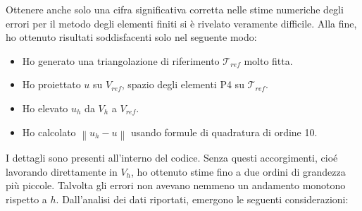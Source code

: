 \documentclass[a4paper]{article}
\newcommand{\norm}[1]{\left\lVert#1\right\rVert}
\begin{document}
Ottenere anche solo una cifra significativa corretta nelle stime numeriche
degli errori per il metodo degli elementi finiti si è rivelato veramente difficile.
Alla fine, ho ottenuto risultati soddisfacenti solo nel seguente modo:
\begin{itemize}
\item Ho generato una triangolazione di riferimento $\mathcal{T}_{ref}$ molto fitta.
\item Ho proiettato $u$ su $V_{ref}$, spazio degli elementi P4 su $\mathcal{T}_{ref}$.
\item Ho elevato $u_h$ da $V_h$ a $V_{ref}$.
\item Ho calcolato $\norm{u_h - u}$ usando formule di quadratura di ordine 10.
\end{itemize}
I dettagli sono presenti all'interno del codice. Senza questi accorgimenti,
cioé lavorando direttamente in $V_h$, ho ottenuto stime fino a due ordini
di grandezza più piccole. Talvolta gli errori non avevano nemmeno
un andamento monotono rispetto a $h$.
Dall'analisi dei dati riportati, emergono le seguenti considerazioni:
\end{document}
